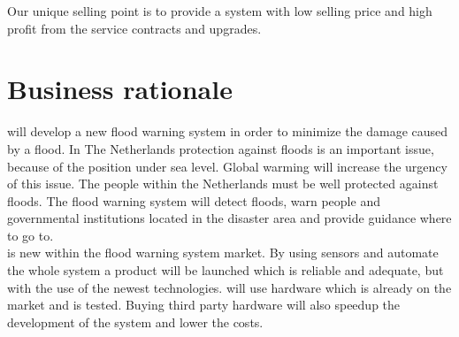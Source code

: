 \newcommand{\Opportunities}{
\SwotItems{
	\item Due to climate change, the market will grow and such a system becomes more urgent
	\item Few competitors in the market
	\item With a bigger program team, the pros and cons of the decisions are more clear
	\item Allowing the system to be flexible so it can also be used for other kinds of monitoring activities
	\item Smart sensors are a hot topic, new sensors will be developed. Making the system support and use the newest sensors allows it to obtain more, and a wider variety of valuable information
}
}

\newcommand{\Threats}{
\SwotItems{
	\item High production costs
	\item Competitors will enter the market because of growing market
	\item New competitors will enter the market
	\item Climate change will forces the system to be improved over time.
	\item Changes of the external systems that our system uses to properly communicate.
	\item The sizes of certain area{'}s to monitor can be too big to get a good and reliable view of them
}
}



Our unique selling point is to provide a system with low selling price and high profit from the service contracts and upgrades.

\section{Business rationale}
\CompanyName will develop a new flood warning system in order to minimize the damage caused by a flood. In The Netherlands protection against floods is an important issue, because of the position under sea level. Global warming will increase the urgency of this issue. The people within the Netherlands must be well protected against floods. The flood warning system will detect floods, warn people and governmental institutions located in the disaster area and provide guidance where to go to. 
\\
\CompanyName is new within the flood warning system market. By using sensors and automate the whole system a product will be launched which is reliable and adequate, but with the use of the newest technologies. \CompanyName will use hardware which is already on the market and is tested. Buying third party hardware will also speedup the development of the system and lower the costs.\\

